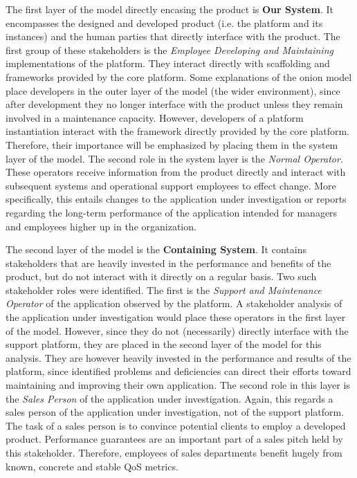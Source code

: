 The first layer of the model directly encasing the product is \textbf{Our System}. It encompasses the designed and developed product (i.e. the platform and its instances) and the human parties that directly interface with the product. The first group of these stakeholders is the \emph{Employee Developing and Maintaining} implementations of the platform. They interact directly with scaffolding and frameworks provided by the core platform. Some explanations of the onion model place developers in the outer layer of the model (the wider environment), since after development they no longer interface with the product unless they remain involved in a maintenance capacity. However, developers of a platform instantiation interact with the framework directly provided by the core platform. Therefore, their importance will be emphasized by placing them in the system layer of the model. The second role in the system layer is the \emph{Normal Operator}. These operators receive information from the product directly and interact with subsequent systems and operational support employees to effect change. More specifically, this entails changes to the application under investigation or reports regarding the long-term performance of the application intended for managers and employees higher up in the organization.

The second layer of the model is the \textbf{Containing System}. It contains stakeholders that are heavily invested in the performance and benefits of the product, but do not interact with it directly on a regular basis. Two such stakeholder roles were identified. The first is the \emph{Support and Maintenance Operator} of the application observed by the platform. A stakeholder analysis of the application under investigation would place these operators in the first layer of the model. However, since they do not (necessarily) directly interface with the support platform, they are placed in the second layer of the model for this analysis. They are however heavily invested in the performance and results of the platform, since identified problems and deficiencies can direct their efforts toward maintaining and improving their own application. The second role in this layer is the \emph{Sales Person} of the application under investigation. Again, this regards a sales person of the application under investigation, not of the support platform. The task of a sales person is to convince potential clients to employ a developed product. Performance guarantees are an important part of a sales pitch held by this stakeholder. Therefore, employees of sales departments benefit hugely from known, concrete and stable QoS metrics.

